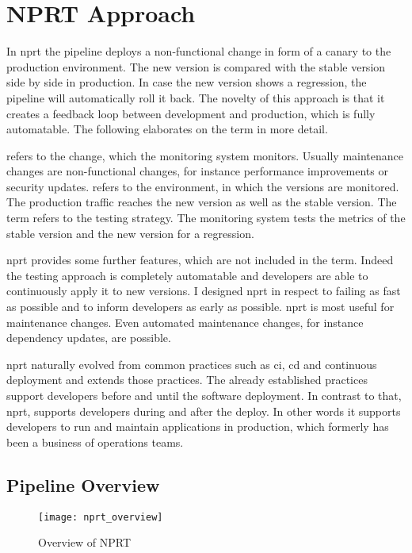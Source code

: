 \chapter{NPRT Approach}
\label{chap:macro}

In \gls{nprt} the pipeline deploys a non-functional change in form of a canary to the
production environment. The new version is compared with the stable version side by side
in production. In case the new version shows a regression, the pipeline will automatically
roll it back. The novelty of this approach is that it creates a feedback loop between
development and production, which is fully automatable. The following elaborates on the
term in more detail.

 refers to the change, which the monitoring system monitors. Usually
maintenance changes are non-functional changes, for instance performance improvements or
security updates.  refers to the environment, in which the versions are
monitored. The production traffic reaches the new version as well as the stable
version. The term  refers to the testing strategy. The monitoring system
tests the metrics of the stable version and the new version for a regression.

\gls{nprt} provides some further features, which are not included in the term. Indeed the
testing approach is completely automatable and developers are able to continuously apply
it to new versions. I designed \gls{nprt} in respect to failing as fast as possible and to
inform developers as early as possible. \gls{nprt} is most useful for maintenance
changes. Even automated maintenance changes, for instance dependency updates, are
possible.

\gls{nprt} naturally evolved from common practices such as \gls{ci}, \gls{cd} and
continuous deployment and extends those practices. The already established practices
support developers before and until the software deployment. In contrast to that,
\gls{nprt}, supports developers during and after the deploy. In other words it supports
developers to run and maintain applications in production, which formerly has been a
business of operations teams.

\section{Pipeline Overview}

\begin{figure}[htbp]
  \texttt{[image: nprt\_overview]}
  \caption{Overview of NPRT}
  \label{fig:nprt_flow}
\end{figure}

